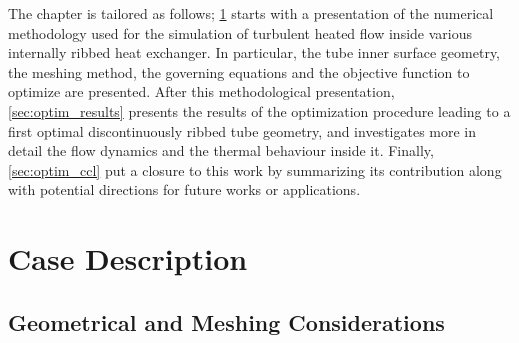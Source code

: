 The chapter is tailored as follows; \cref{sec:optim_case} starts with a presentation of the numerical methodology used for the simulation of turbulent heated flow inside various internally ribbed heat exchanger. In particular, the tube inner surface geometry, the meshing method, the governing equations and the objective function to optimize are presented. After this methodological presentation, \cref{sec:optim_results} presents the results of the optimization procedure leading to a first optimal discontinuously ribbed tube geometry, and investigates more in detail the flow dynamics and the thermal behaviour inside it. Finally, \cref{sec:optim_ccl} put a closure to this work by summarizing its contribution along with potential directions for future works or applications.

\section{Case Description}
\label{sec:optim_case}

\subsection{Geometrical and Meshing Considerations}

